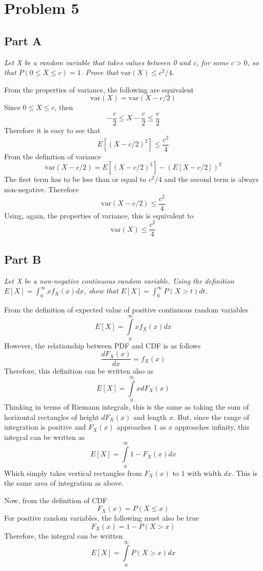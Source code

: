 \documentclass{article}
\begin{document}
\section*{Problem 5}

\subsection*{Part A}

\textit{Let X be a random variable that takes values between 0 and c, for
some $ c > 0 $, so that $P(0 \leq X \leq c) = 1$. Prove that $\mathrm{var}(X)
\leq c^2/4$.}

\bigbreak

From the properties of variance, the following are equivalent
$$ \mathrm{var}(X) = \mathrm{var}(X - c / 2) $$
Since $ 0 \leq X \leq c $, then
$$ -\frac{c}{2} \leq X - \frac{c}{2} \leq \frac{c}{2} $$
Therefore it is easy to see that
$$ E[(X - c/2)^2] \leq \frac{c^2}{4} $$
From the definition of variance
$$ \mathrm{var}(X - c / 2) = E[(X - c/2)^2] - (E[X - c / 2])^2 $$
The first term has to be less than or equal to $ c^2 / 4 $ and the second
term is always non-negative. Therefore
$$ \mathrm{var}(X - c / 2) \leq \frac{c^2}{4} $$
Using, again, the properties of variance, this is equivalent to
$$ \mathrm{var}(X) \leq \frac{c^2}{4} $$

\subsection*{Part B}

\textit{Let X be a non-negative continuous random variable. Using the
definition $E[X] = \int_0^{\infty} x f_X(x) dx $, show that $ E[X] =
\int_0^{\infty} P(X > t) dt $.}

\bigbreak

From the definition of expected value of positive continuous random variables
$$ E[X] = \int\limits_0^\infty x f_X(x) dx $$
However, the relationship between PDF and CDF is as follows
$$ \frac{dF_X(x)}{dx} = f_X(x) $$
Therefore, this definition can be written also as
$$ E[X] = \int\limits_0^\infty x dF_X(x) $$
Thinking in terms of Riemann integrals, this is the same as taking the sum of
horizontal rectangles of height $ dF_X(x) $ and length $x$. But, since the
range of integration is positive and $F_X(x)$ approaches $1$ as $x$ approaches
infinity, this integral can be written as
$$ E[X] = \int\limits_0^\infty 1 - F_X(x) dx $$
Which simply takes vertical rectangles from $F_X(x)$ to $1$ with width $dx$.
This is the same area of integration as above.

Now, from the definition of CDF
$$ F_X(x) = P(X \leq x) $$
For positive random variables, the following must also be true
$$ F_X(x) = 1 - P(X > x) $$
Therefore, the integral can be written
$$ E[X] = \int\limits_0^\infty P(X > x) dx $$
\end{document}
